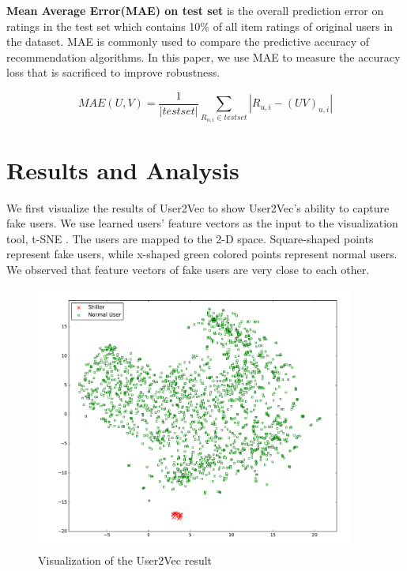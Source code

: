 \documentclass[master,english,final]{kaist-ucs}
\begin{document}
\textbf{Mean Average Error(MAE) on test set} is the overall prediction error on ratings in the test set which contains 10\% of all item ratings of original users in the dataset.
MAE is commonly used to compare the predictive accuracy of recommendation algorithms.
In this paper, we use MAE to measure the accuracy loss that is sacrificed to improve robustness.

\begin{equation}
MAE(U,V) = \frac{1}{|test set|} \sum_{R_{u,i} \in test set} |R_{u,i}-(UV)_{u,i}|
\end{equation}



\section{Results and Analysis}
We first visualize the results of User2Vec to show User2Vec's ability to capture fake users.
We use learned users' feature vectors as the input to the visualization tool, t-SNE \cite{TSNE}.
The users are mapped to the 2-D space.
Square-shaped points represent fake users, while x-shaped green colored points represent normal users.
We observed that feature vectors of fake users are very close to each other.
\begin{figure}[h]
    \centerline{\includegraphics[width=10.5cm]{figure/user2vec_result.pdf}}
    \caption{  Visualization of the User2Vec result } \label{user2vec_result}
\end{figure}

\end{document}
